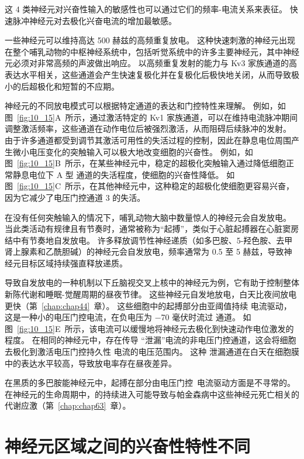 这 4 类神经元对兴奋性输入的敏感性也可以通过它们的频率-电流关系来表征。
快速脉冲神经元对去极化兴奋电流的增加最敏感。


一些神经元可以维持高达 500 赫兹的高频重复放电。
这种快速刺激的神经元出现在整个哺乳动物的中枢神经系统中，包括听觉系统中的许多主要神经元，其中神经元必须对非常高频的声波做出响应。
以高频重复发射的能力与 Kv3 家族通道的高表达水平相关，这些通道会产生快速复极化并在复极化后极快地关闭，从而导致极小的后超极化和短暂的不应期。


神经元的不同放电模式可以根据特定通道的表达和门控特性来理解。
例如，如图~\ref{fig:10_15}A~所示，通过激活特定的 Kv1 家族通道，可以在维持电流脉冲期间调整激活频率，这些通道在动作电位后被强烈激活，从而阻碍后续脉冲的发射。
由于许多通道都受到调节其激活可用性的失活过程的控制，因此在静息电位周围产生微小电压变化的突触输入可以极大地改变细胞的兴奋性。
例如，如图~\ref{fig:10_15}B~所示，在某些神经元中，稳定的超极化突触输入通过降低细胞正常静息电位下 A 型  通道的失活程度，使细胞的兴奋性降低。
如图~\ref{fig:10_15}C~所示，在其他神经元中，这种稳定的超极化使细胞更容易兴奋，因为它减少了电压门控通道 3 的失活。


在没有任何突触输入的情况下，哺乳动物大脑中数量惊人的神经元会自发放电。
当此类活动有规律且有节奏时，通常被称为“起搏”，类似于心脏起搏器在心脏窦房结中有节奏地自发放电。
许多释放调节性神经递质（如多巴胺、5-羟色胺、去甲肾上腺素和乙酰胆碱）的神经元会自发放电，频率通常为 0.5 至 5 赫兹，导致神经元目标区域持续强直释放递质。


导致自发放电的一种机制以下丘脑视交叉上核中的神经元为例，它有助于控制整体新陈代谢和睡眠-觉醒周期的昼夜节律。
这些神经元自发地放电，白天比夜间放电更快（第~\ref{chap:chap44}~章）。 
这些细胞中的起搏部分由亚阈值持续  电流驱动，这是一种小的电压门控电流，在负电压为 −70 毫伏时流过  通道。
如图~\ref{fig:10_15}E~所示，该电流可以缓慢地将神经元去极化到快速动作电位激发的程度。
在相同的神经元中，存在传导 “泄漏”电流的非电压门控通道，这会将细胞去极化到激活电压门控持久性  电流的电压范围内。
这种  泄漏通道在白天在细胞膜中的表达水平较高，导致放电率存在昼夜差异。


在黑质的多巴胺能神经元中，起搏在部分由电压门控~电流驱动方面是不寻常的。
在神经元的生命周期中，的持续进入可能导致与帕金森病中这些神经元死亡相关的代谢应激（第~\ref{chap:chap63}~章）。



\section{神经元区域之间的兴奋性特性不同}

